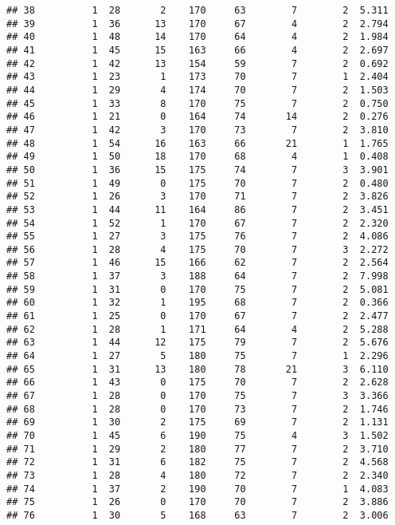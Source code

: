 \documentclass[12pt,]{article}
\begin{document}
\begin{verbatim}
## 38          1  28       2    170     63        7        2  5.311
## 39          1  36      13    170     67        4        2  2.794
## 40          1  48      14    170     64        4        2  1.984
## 41          1  45      15    163     66        4        2  2.697
## 42          1  42      13    154     59        7        2  0.692
## 43          1  23       1    173     70        7        1  2.404
## 44          1  29       4    174     70        7        2  1.503
## 45          1  33       8    170     75        7        2  0.750
## 46          1  21       0    164     74       14        2  0.276
## 47          1  42       3    170     73        7        2  3.810
## 48          1  54      16    163     66       21        1  1.765
## 49          1  50      18    170     68        4        1  0.408
## 50          1  36      15    175     74        7        3  3.901
## 51          1  49       0    175     70        7        2  0.480
## 52          1  26       3    170     71        7        2  3.826
## 53          1  44      11    164     86        7        2  3.451
## 54          1  52       1    170     67        7        2  2.320
## 55          1  27       3    175     76        7        2  4.086
## 56          1  28       4    175     70        7        3  2.272
## 57          1  46      15    166     62        7        2  2.564
## 58          1  37       3    188     64        7        2  7.998
## 59          1  31       0    170     75        7        2  5.081
## 60          1  32       1    195     68        7        2  0.366
## 61          1  25       0    170     67        7        2  2.477
## 62          1  28       1    171     64        4        2  5.288
## 63          1  44      12    175     79        7        2  5.676
## 64          1  27       5    180     75        7        1  2.296
## 65          1  31      13    180     78       21        3  6.110
## 66          1  43       0    175     70        7        2  2.628
## 67          1  28       0    170     75        7        3  3.366
## 68          1  28       0    170     73        7        2  1.746
## 69          1  30       2    175     69        7        2  1.131
## 70          1  45       6    190     75        4        3  1.502
## 71          1  29       2    180     77        7        2  3.710
## 72          1  31       6    182     75        7        2  4.568
## 73          1  28       4    180     72        7        2  2.340
## 74          1  37       2    190     70        7        1  4.083
## 75          1  26       0    170     70        7        2  3.886
## 76          1  30       5    168     63        7        2  3.006

\end{verbatim}
\end{document}
